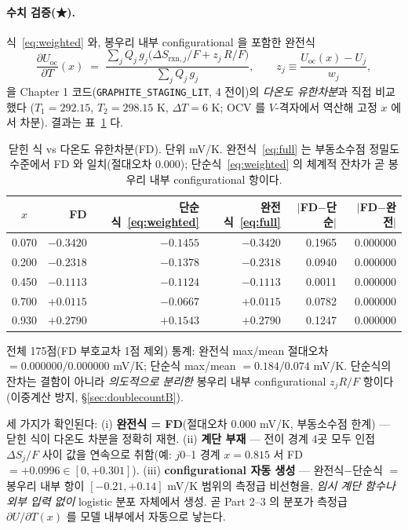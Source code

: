 \documentclass[11pt,a4paper]{article}
\newcommand{\rxn}{\mathrm{rxn}}
\newcommand{\oc}{\mathrm{oc}}
\begin{document}
\paragraph{수치 검증(★).} 식~\eqref{eq:weighted} 와, 봉우리 내부 configurational 을 포함한 완전식
\begin{equation}
\frac{\partial U_\oc}{\partial T}(x)
  \;=\; \frac{\sum_j Q_j\,g_j\big(\Delta S_{\rxn,j}/F + z_j\,R/F\big)}{\sum_j Q_j\,g_j},
\qquad z_j \equiv \frac{U_\oc(x)-U_j}{w_j},
\label{eq:full}
\end{equation}
을 Chapter 1 코드(\texttt{GRAPHITE\_STAGING\_LIT}, 4 전이)의 \emph{다온도 유한차분}과 직접 비교했다
($T_1=292.15$, $T_2=298.15$ K, $\Delta T=6$ K; OCV 를 $V$-격자에서 역산해 고정 $x$ 에서 차분). 결과는
표~\ref{tab:verify} 다.
\begin{table}[t]
\centering\small
\renewcommand{\arraystretch}{1.18}
\caption{닫힌 식 vs 다온도 유한차분(FD). 단위 mV/K. 완전식~\eqref{eq:full} 는 부동소수점 정밀도
수준에서 FD 와 일치(절대오차 $0.000$); 단순식~\eqref{eq:weighted} 의 체계적 잔차가 곧 봉우리 내부
configurational 항이다.}
\label{tab:verify}
\begin{tabular}{c r r r r r}
\toprule
$x$ & FD & 단순식~\eqref{eq:weighted} & 완전식~\eqref{eq:full} & $|$FD$-$단순$|$ & $|$FD$-$완전$|$ \\
\midrule
0.070 & $-0.3420$ & $-0.1455$ & $-0.3420$ & 0.1965 & $0.000000$ \\
0.200 & $-0.2318$ & $-0.1378$ & $-0.2318$ & 0.0940 & $0.000000$ \\
0.450 & $-0.1113$ & $-0.1124$ & $-0.1113$ & 0.0011 & $0.000000$ \\
0.700 & $+0.0115$ & $-0.0667$ & $+0.0115$ & 0.0782 & $0.000000$ \\
0.930 & $+0.2790$ & $+0.1543$ & $+0.2790$ & 0.1247 & $0.000000$ \\
\bottomrule
\end{tabular}

\smallskip
{\footnotesize 전체 175점(FD 부호교차 1점 제외) 통계: 완전식 max/mean 절대오차 $=0.000000/0.000000$ mV/K;
단순식 max/mean $=0.184/0.074$ mV/K. 단순식의 잔차는 결함이 아니라 \emph{의도적으로 분리한} 봉우리 내부
configurational $z_jR/F$ 항이다(이중계산 방지, \S\ref{sec:doublecountB}).}
\end{table}
세 가지가 확인된다: (i) \textbf{완전식 = FD}(절대오차 $0.000$ mV/K, 부동소수점 한계) — 닫힌 식이
다온도 차분을 정확히 재현. (ii) \textbf{계단 부재} — 전이 경계 4곳 모두 인접 $\Delta S_j/F$ 사이 값을
연속으로 취함(예: $j$0--1 경계 $x{=}0.815$ 서 FD$=+0.0996\in[0,+0.301]$). (iii) \textbf{configurational
자동 생성} — 완전식$-$단순식 $=$ 봉우리 내부 항이 $[-0.21,+0.14]$ mV/K 범위의 측정급 비선형을, \emph{임시
계단 함수나 외부 입력 없이} logistic 분포 자체에서 생성. 곧 Part 2--3 의 분포가 측정급 $\partial U/\partial T(x)$
를 모델 내부에서 자동으로 낳는다.
\end{document}
